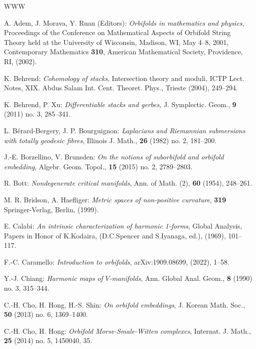 \documentclass[
  a4paper, 
  reqno, 
  oneside, 
  12pt
]{amsart}
\theoremstyle{definition}
\theoremstyle{remark}
\begin{document}
\begin{thebibliography}{WWW}
	
 A. Adem, J. Morava, Y. Ruan (Editors): \emph{Orbifolds in mathematics and physics}, Proceedings of the {C}onference on {M}athematical {A}spects of
{O}rbifold {S}tring {T}heory held at the {U}niversity of
{W}isconsin, {M}adison, {WI}, {M}ay 4--8, 2001,  Contemporary Mathematics {\bf 310}, American Mathematical Society, Providence, RI, (2002).

 K. Behrend:  {\it Cohomology of stacks}, Intersection theory and moduli, ICTP Lect. Notes, XIX. Abdus Salam Int. Cent. Theoret. Phys., Trieste (2004), 249--294.	

 K. Behrend, P. Xu: \emph{Differentiable stacks and gerbes,} J. Symplectic. Geom., {\bf 9} (2011) no. 3, 285--341.

 L. B\'{e}rard-Bergery, J. P. Bourguignon: \emph{Laplacians and {R}iemannian submersions with totally geodesic fibres},  Illinois J. Math., {\bf 26} (1982) no. 2, 181--200.

 J.-E. Borzellino, V. Brunsden:  {\it On the notions of suborbifold and orbifold embedding}, Algebr. Geom. Topol.,  {\bf 15} (2015) no. 2, 2789--2803.


 R. Bott:  {\it Nondegenerate critical manifolds}, Ann. of Math. (2),  {\bf 60} (1954), 248--261.


 M. R. Bridson, A. Haefliger: \emph{Metric spaces of non-positive curvature}, {\bf 319} Springer-Verlag, Berlin, (1999).

 E. Calabi:  {\it An intrinsic characterization of harmonic 1-forms}, Global Analysis, Papers in Honor of K.Kodaira, (D.C.Spencer and S.Iyanaga, ed.), (1969), 101--117.

 F.-C. Caramello:  {\it Introduction to orbifolds}, arXiv:1909.08699, (2022), 1--58.



 Y.-J. Chiang: {\it Harmonic maps of {$V$}-manifolds}, Ann. Global Anal. Geom., {\bf 8} (1990) no. 3, 315--344.

 C.-H. Cho, H. Hong, H.-S. Shin: {\it On orbifold embeddings}, J. Korean Math. Soc., {\bf 50} (2013) no. 6, 1369--1400.

 C.-H. Cho, H. Hong: \emph{Orbifold Morse-Smale-Witten complexes}, Internat. J. Math., {\bf 25} (2014) no. 5, 1450040, 35.



\end{thebibliography}
\end{document}
